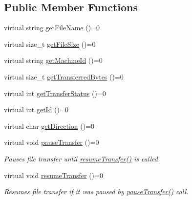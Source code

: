 \subsection*{\-Public \-Member \-Functions}
\begin{DoxyCompactItemize}
\item 
virtual string \hyperlink{classfileStatus__t_ab4a930279f7b70a34ae876d487d037c8}{get\-File\-Name} ()=0
\item 
virtual size\-\_\-t \hyperlink{classfileStatus__t_ae38d036556ce8d416cd3ee53540016ec}{get\-File\-Size} ()=0
\item 
virtual string \hyperlink{classfileStatus__t_af07d681a3643982bf53e8b5d75cb5461}{get\-Machine\-Id} ()=0
\item 
virtual size\-\_\-t \hyperlink{classfileStatus__t_acddc8e41ac33a0dee1f6ef4850191ef8}{get\-Transferred\-Bytes} ()=0
\item 
virtual int \hyperlink{classfileStatus__t_adcd46df07efed25764d4849e6dc174a6}{get\-Transfer\-Status} ()=0
\item 
virtual int \hyperlink{classfileStatus__t_a8f9d259fefed73f267cea591cf938836}{get\-Id} ()=0
\item 
virtual char \hyperlink{classfileStatus__t_ac01e9232b43a660c867d55baeccd7c63}{get\-Direction} ()=0
\item 
\hypertarget{classfileStatus__t_a0aa4cb28df1321325a3b4001677945de}{virtual void \hyperlink{classfileStatus__t_a0aa4cb28df1321325a3b4001677945de}{pause\-Transfer} ()=0}\label{classfileStatus__t_a0aa4cb28df1321325a3b4001677945de}

\begin{DoxyCompactList}\small\item\em \-Pauses file transfer until \hyperlink{classfileStatus__t_a2edb9d9c828108ad072f4218198bcb82}{resume\-Transfer()} is called. \end{DoxyCompactList}\item 
\hypertarget{classfileStatus__t_a2edb9d9c828108ad072f4218198bcb82}{virtual void \hyperlink{classfileStatus__t_a2edb9d9c828108ad072f4218198bcb82}{resume\-Transfer} ()=0}\label{classfileStatus__t_a2edb9d9c828108ad072f4218198bcb82}

\begin{DoxyCompactList}\small\item\em \-Resumes file transfer if it was paused by \hyperlink{classfileStatus__t_a0aa4cb28df1321325a3b4001677945de}{pause\-Transfer()} call. \end{DoxyCompactList}\end{DoxyCompactItemize}


